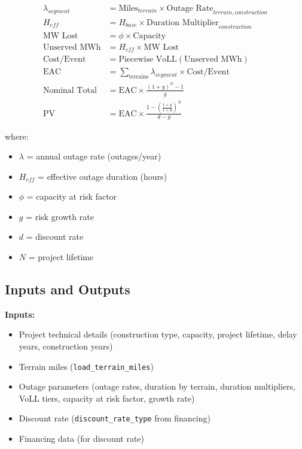 \documentclass[ctcc_full_documentation.tex]{subfiles}
\begin{document}
\begin{align}
\lambda_{segment} &= \text{Miles}_{terrain} \times \text{Outage Rate}_{terrain,construction} \\
H_{eff} &= H_{base} \times \text{Duration Multiplier}_{construction} \\
\text{MW Lost} &= \phi \times \text{Capacity} \\
\text{Unserved MWh} &= H_{eff} \times \text{MW Lost} \\
\text{Cost/Event} &= \text{Piecewise VoLL}(\text{Unserved MWh}) \\
\text{EAC} &= \sum_{\text{terrains}} \lambda_{segment} \times \text{Cost/Event} \\
\text{Nominal Total} &= \text{EAC} \times \frac{(1+g)^N - 1}{g} \\
\text{PV} &= \text{EAC} \times \frac{1 - \left(\frac{1+g}{1+d}\right)^N}{d - g}
\end{align}

where:
\begin{itemize}
    \item $\lambda$ = annual outage rate (outages/year)
    \item $H_{eff}$ = effective outage duration (hours)
    \item $\phi$ = capacity at risk factor
    \item $g$ = risk growth rate
    \item $d$ = discount rate
    \item $N$ = project lifetime
\end{itemize}

\subsection{Inputs and Outputs}

\textbf{Inputs:}
\begin{itemize}
    \item Project technical details (construction type, capacity, project lifetime, delay years, construction years)
    \item Terrain miles (\texttt{load\_terrain\_miles})
    \item Outage parameters (outage rates, duration by terrain, duration multipliers, VoLL tiers, capacity at risk factor, growth rate)
    \item Discount rate (\texttt{discount\_rate\_type} from financing)
    \item Financing data (for discount rate)
\end{itemize}
\end{document}
